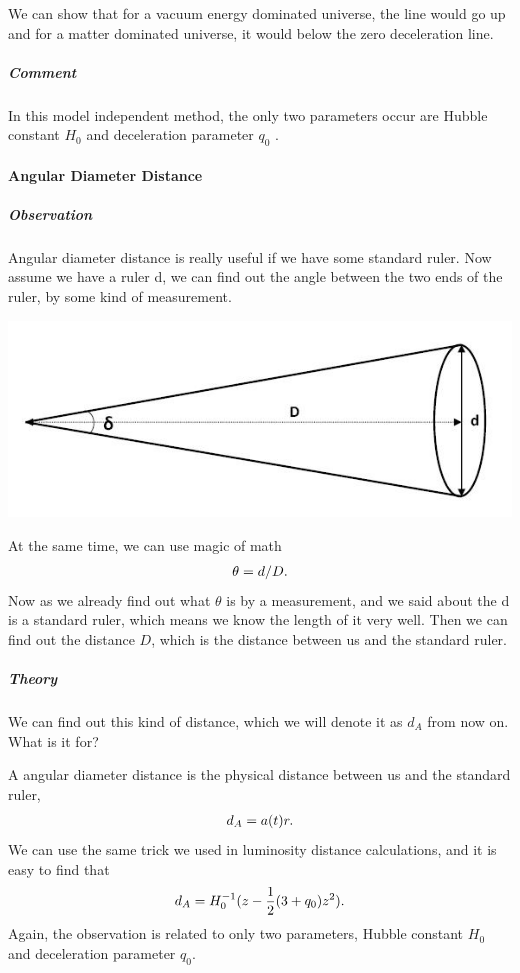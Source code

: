 \documentclass[letterpaper,10pt,english]{sphinxmanual}
\begin{document}
We can show that for a vacuum energy dominated universe, the line would go up and for a matter dominated universe, it would below the zero deceleration line.


\subparagraph{Comment}
\label{Cosmology/cosmoIndex:comment}
In this model independent method, the only two parameters occur are Hubble constant \(H_0\) and deceleration parameter \(q_0\) .


\paragraph{Angular Diameter Distance}
\label{Cosmology/cosmoIndex:angular-diameter-distance}

\subparagraph{Observation}
\label{Cosmology/cosmoIndex:observation}
Angular diameter distance is really useful if we have some standard ruler. Now assume we have a ruler d, we can find out the angle between the two ends of the ruler, by some kind of measurement.

\includegraphics{AngularDiaFormula.jpg}

At the same time, we can use magic of math
\begin{gather}
\begin{split}\theta = d/D .\end{split}\notag
\end{gather}
Now as we already find out what \(\theta\) is by a measurement, and we said about the d is a standard ruler, which means we know the length of it very well. Then we can find out the distance \(D\), which is the distance between us and the standard ruler.


\subparagraph{Theory}
\label{Cosmology/cosmoIndex:theory}
We can find out this kind of distance, which we will denote it as \(d_A\) from now on. What is it for?

A angular diameter distance is the physical distance between us and the standard ruler,
\begin{gather}
\begin{split}d_A = a(t)r .\end{split}\notag
\end{gather}
We can use the same trick we used in luminosity distance calculations, and it is easy to find that
\begin{gather}
\begin{split}d_A = H_0^{-1} (z - \frac{1}{2} (3 + q_0)z^2 ) .\end{split}\notag
\end{gather}
Again, the observation is related to only two parameters, Hubble constant \(H_0\) and deceleration parameter \(q_0\).
\end{document}
